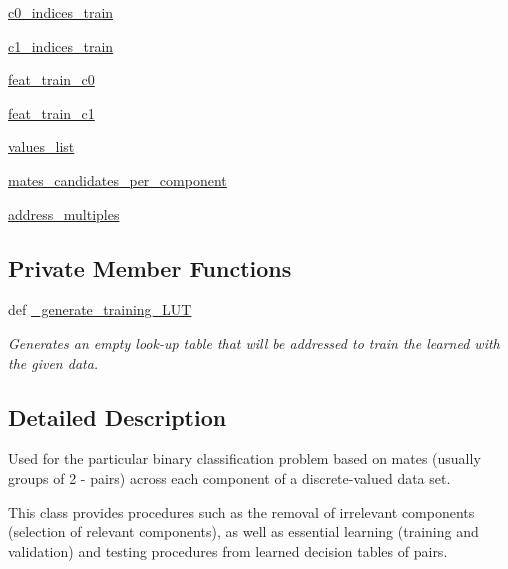 \begin{DoxyCompactItemize}
\hyperlink{classmate__learning_1_1_mate_finder_a6f92751c17d9794258343fd7c5d5a4d5}{c0\+\_\+indices\+\_\+train}
\item 
\hyperlink{classmate__learning_1_1_mate_finder_a247fd9ebecfbbcd44c638803cdaf2bce}{c1\+\_\+indices\+\_\+train}
\item 
\hyperlink{classmate__learning_1_1_mate_finder_a3577286991dc86227a3275cefd8d02af}{feat\+\_\+train\+\_\+c0}
\item 
\hyperlink{classmate__learning_1_1_mate_finder_a9c00a7acd25f415074e73b3d8862d38d}{feat\+\_\+train\+\_\+c1}
\item 
\hyperlink{classmate__learning_1_1_mate_finder_a72604851fbd5d9d64ef8f21ab3bbb08b}{values\+\_\+list}
\item 
\hyperlink{classmate__learning_1_1_mate_finder_a1feda94256f5a694c6102f83c3fc8ce7}{mates\+\_\+candidates\+\_\+per\+\_\+component}
\item 
\hyperlink{classmate__learning_1_1_mate_finder_ac42fe95eaa044c91077b75953128fc23}{address\+\_\+multiples}
\end{DoxyCompactItemize}
\subsection*{Private Member Functions}
\begin{DoxyCompactItemize}
\item 
def \hyperlink{classmate__learning_1_1_mate_finder_a43b8d42cc7b3529697262ad628c9cca9}{\+\_\+generate\+\_\+training\+\_\+\+L\+U\+T}
\begin{DoxyCompactList}\small\item\em Generates an empty look-\/up table that will be addressed to train the learned with the given data. \end{DoxyCompactList}\end{DoxyCompactItemize}


\subsection{Detailed Description}
Used for the particular binary classification problem based on mates (usually groups of 2 -\/ pairs) across each component of a discrete-\/valued data set. 

This class provides procedures such as the removal of irrelevant components (selection of relevant components), as well as essential learning (training and validation) and testing procedures from learned decision tables of pairs.

